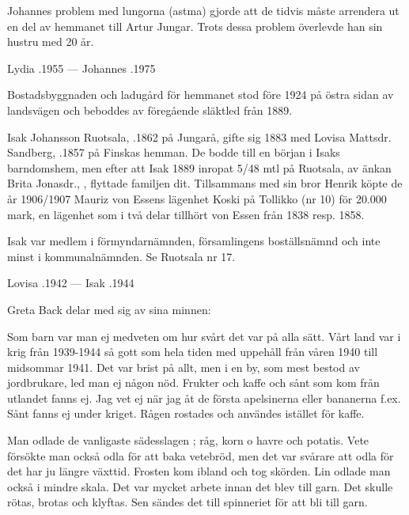 Johannes problem med lungorna (astma) gjorde att de tidvis måste arrendera ut en del av hemmanet till Artur Jungar. Trots dessa problem överlevde han sin hustru med 20 år.
\begin{jhchildren}
  \item {}
  \item {}
\end{jhchildren}

Lydia .1955  ---  Johannes .1975



Bostadsbyggnaden och ladugård för hemmanet stod före 1924 på östra sidan av landsvägen och beboddes av föregående släktled från 1889.\jhvspace{}


%
Isak Johansson Ruotsala, .1862 på Jungarå,  gifte sig 1883 med Lovisa Mattsdr. Sandberg, .1857 på Finskas hemman. De bodde till en början i Isaks barndomshem, men efter att Isak 1889 inropat 5/48 mtl på Ruotsala, av änkan Brita Jonasdr., , flyttade familjen dit. Tillsammans med sin bror Henrik köpte de år 1906/1907 Mauriz von Essens lägenhet Koski på Tollikko (nr 10) för 20.000 mark, en lägenhet som i två delar tillhört von Essen från 1838 resp. 1858.

Isak var medlem i förmyndarnämnden, församlingens boställsnämnd och inte minst i kommunalnämnden. Se Ruotsala nr 17.

Lovisa .1942  ---  Isak .1944


Greta Back delar med sig av sina minnen:


Som barn var man ej medveten om hur svårt det var på alla sätt. Vårt land var i krig från 1939-1944 så gott som hela tiden med uppehåll från våren 1940 till midsommar 1941. Det var brist på allt, men i en by, som mest bestod av jordbrukare, led man ej någon nöd. Frukter och kaffe och sånt som kom från utlandet fanns ej. Jag vet ej när jag åt de första apelsinerna eller bananerna f.ex. Sånt fanns ej under kriget. Rågen rostades och användes istället för kaffe.

Man odlade de vanligaste sädesslagen ; råg, korn o havre och potatis. Vete försökte man också odla för att baka vetebröd, men det var svårare att odla för det har ju längre växttid. Frosten kom ibland och tog skörden. Lin odlade man också i mindre skala. Det var mycket arbete innan det blev till garn. Det skulle rötas, brotas och klyftas. Sen sändes det till spinneriet för att bli till garn.

